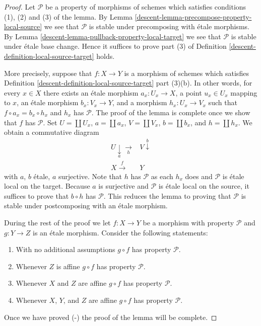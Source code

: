 \begin{proof}

Let $\mathcal{P}$ be a property of morphisms of schemes which
satisfies conditions (1), (2) and (3) of the lemma. By
Lemma \ref{descent-lemma-precompose-property-local-source}
we see that $\mathcal{P}$ is stable under precomposing with
\'etale morphisms. By
Lemma \ref{descent-lemma-pullback-property-local-target}
we see that $\mathcal{P}$ is stable under \'etale base change.
Hence it suffices to prove part (3) of
Definition \ref{descent-definition-local-source-target}
holds.

\medskip\noindent
More precisely, suppose that $f : X \to Y$ is a morphism
of schemes which satisfies
Definition \ref{descent-definition-local-source-target} part (3)(b).
In other words, for every $x \in X$ there exists an \'etale
morphism $a_x : U_x \to X$, a point $u_x \in U_x$ mapping to $x$,
an \'etale morphism $b_x : V_x \to Y$, and a morphism $h_x : U_x \to V_x$
such that $f \circ a_x = b_x \circ h_x$ and $h_x$ has $\mathcal{P}$.
The proof of the lemma is complete once we show that $f$ has $\mathcal{P}$.
Set $U = \coprod U_x$, $a = \coprod a_x$, $V = \coprod V_x$,
$b = \coprod b_x$, and $h = \coprod h_x$. We obtain a
commutative diagram
$$
\begin{array}{cc}U \underset{a}{\downarrow}\underset{h}{\longrightarrow} & V \overset{b}{\downarrow} \\ X \overset{f}{\longrightarrow} & Y\end{array}
$$
with $a$, $b$ \'etale, $a$ surjective. Note that $h$ has $\mathcal{P}$
as each $h_x$ does and $\mathcal{P}$ is \'etale local on the target.
Because $a$ is surjective and $\mathcal{P}$ is \'etale local on the source,
it suffices to prove that $b \circ h$ has $\mathcal{P}$.
This reduces the lemma to proving that $\mathcal{P}$ is stable under
postcomposing with an \'etale morphism.

\medskip\noindent
During the rest of the proof we let $f : X \to Y$ be a
morphism with property $\mathcal{P}$ and $g : Y \to Z$ is an \'etale
morphism. Consider the following statements:
\begin{enumerate}
\item[(-)] With no additional assumptions $g \circ f$
has property $\mathcal{P}$.
\item[(A)] Whenever $Z$ is affine
$g \circ f$ has property $\mathcal{P}$.
\item[(AA)] Whenever $X$ and $Z$ are affine
$g \circ f$ has property $\mathcal{P}$.
\item[(AAA)] Whenever $X$, $Y$, and $Z$ are affine
$g \circ f$ has property $\mathcal{P}$.
\end{enumerate}
Once we have proved (-) the proof of the lemma will be complete.


\end{proof}
